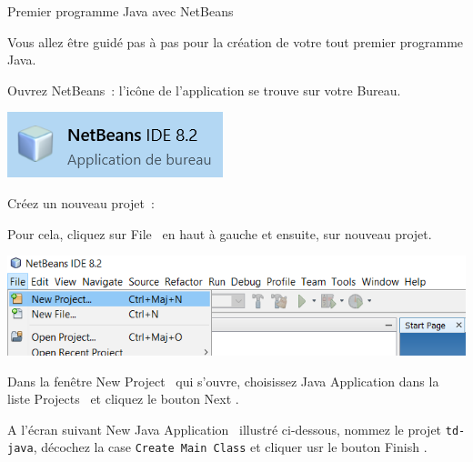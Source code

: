\documentclass[a4paper,11pt]{article}
\begin{document}
	\begin{Tutoriel}{Premier programme Java avec NetBeans}
	
	Vous allez être guidé pas à pas pour la création de votre tout premier programme Java.
	
	\begin{steps}
		\item Ouvrez NetBeans~:
			l'icône de l'application se trouve sur votre Bureau. 
		
			\bigskip
			\begin{center}
				\includegraphics{images/nb_icone}
			\end{center}


		\item Créez un nouveau projet~: 
		
			Pour cela, cliquez sur \og File \fg~en haut à gauche et ensuite, sur nouveau projet. 
			
			\bigskip
			\begin{center}
				\includegraphics[width=\textwidth]{images/nb_newproject}
			\end{center}
			
			Dans la fenêtre \og New Project \fg~qui s'ouvre, choisissez \og Java Application \fg dans la liste \og Projects \fg~et cliquez le bouton \og Next \fg.
			
			A l'écran suivant \og New Java Application \fg~illustré ci-dessous, 
			nommez le projet \texttt{td-java}, décochez la case \texttt{Create Main Class} et cliquer usr le bouton \og Finish \fg.
			

\end{steps}
\end{Tutoriel}
\end{document}
